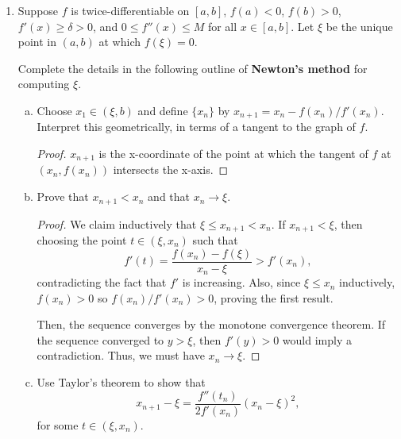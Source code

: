 \begin{enumerate}[1.]
    \begin{proof}
        Consider the derivatives of $f$ and $g$ at their fixed point. We have
        \[
            f'(x) = \frac12 (1 - \alpha/x^2),\ f'(\sqrt{\alpha}) = 0
        \]
        and
        \[
            g'(x) = \frac{1-\alpha}{(1+x)^2},\ g'(\sqrt{\alpha}) = \frac{1+\sqrt{\alpha}}{1-\sqrt{\alpha}} < 0
        \]
        so intuitively, for $x_n$ sufficiently close to $\sqrt{\alpha}$, the horizontal lines for $f$ in the zigzag path take the $x_n$ much closer to $y=\sqrt{\alpha}$ than the corresponding paths in $g$.
    \end{proof}
\item %
    Suppose $f$ is twice-differentiable on $[a, b]$, $f(a) < 0$, $f(b) > 0$, $f'(x) \ge \delta > 0$, and $0 \le f''(x) \le M$ for all $x \in [a, b]$. Let $\xi$ be the unique point in $(a, b)$ at which $f(\xi) = 0$.

    Complete the details in the following outline of \textbf{Newton's method} for computing $\xi$.
    \begin{enumerate}[(a)]
        \item Choose $x_1 \in (\xi, b)$ and define $\{x_n\}$ by $x_{n+1} = x_n - f(x_n) / f'(x_n)$. Interpret this geometrically, in terms of a tangent to the graph of $f$.
            \begin{proof}
                $x_{n+1}$ is the x-coordinate of the point at which the tangent of $f$ at $(x_n, f(x_n))$ intersects the x-axis.
            \end{proof}
        \item Prove that $x_{n+1} < x_n$ and that $x_n \to \xi$.
            \begin{proof}
                We claim inductively that $\xi \le x_{n+1} < x_n$. If $x_{n+1} < \xi$, then choosing the point $t \in (\xi, x_n)$ such that 
                \[
                    f'(t) = \frac{f(x_n)-f(\xi)}{x_n - \xi} > f'(x_n),
                \]
                contradicting the fact that $f'$ is increasing. Also, since $\xi \le x_n$ inductively, $f(x_n) > 0$ so $f(x_n) / f'(x_n) > 0$, proving the first result.

                Then, the sequence converges by the monotone convergence theorem. If the sequence converged to $y > \xi$, then $f'(y) > 0$ would imply a contradiction. Thus, we must have $x_n \to \xi$.
            \end{proof}

        \item Use Taylor's theorem to show that
            \[
                x_{n+1} - \xi = \frac{f''(t_n)}{2f'(x_n)} (x_n - \xi)^2,
            \]
            for some $t \in (\xi, x_n)$.


\end{enumerate}
\end{enumerate}
